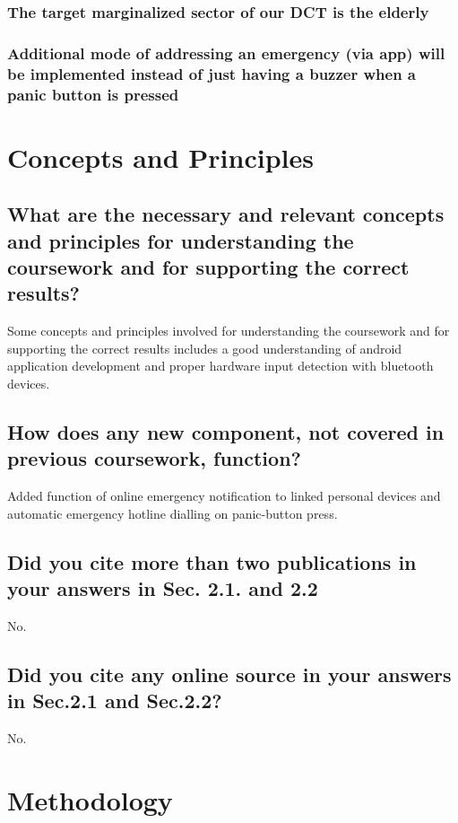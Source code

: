 \subsubsection{The target marginalized sector of our DCT is the elderly}
\subsubsection{Additional mode of addressing an emergency (via app) will be implemented instead of just having a buzzer when a panic button is pressed} 
	


\section{Concepts and Principles}
\label{sec:concps}

\subsection{What are the necessary and relevant concepts and principles for understanding the coursework and for supporting the correct results?}
Some concepts and principles involved for understanding the coursework and for supporting the correct results includes a good understanding of android application development and proper hardware input detection with bluetooth devices.

\subsection{How does any new component, not covered in  previous coursework, function?}
Added function of online emergency notification to linked personal devices and automatic emergency hotline dialling on panic-button press.

\subsection{Did you cite more than two publications in your answers in Sec. 2.1. and 2.2}
No.
	
\subsection{Did you cite any online source in your answers in Sec.2.1 and Sec.2.2?}
No.


\section{Methodology}

